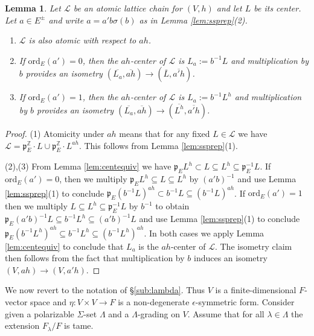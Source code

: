 \documentclass{article}
\def\mf#1{\mathfrak{#1}}
\def\mc#1{\mathcal{#1}}
\def\tx#1{\textrm{#1}}
\def\Z{\mathbb{Z}}
\def\ol#1{\overline{#1}}
\newtheorem{lem}[thm]{Lemma}
\theoremstyle{definition}
\numberwithin{equation}{subsection}
\renewcommand{\-}{\hyp{}}
\newcommand{\oL}{\overline{L}}
\begin{document}
\begin{lem} \label{lem:sign-switch}
	Let $\mc{L}$ be an atomic lattice chain for $(V,h)$ and let $L$ be its center.
	Let $a \in E^\pm$ and write $a=a'b\sigma(b)$ as in Lemma \ref{lem:ssprep}(2).
	\begin{enumerate}
				\item $\mc{L}$ is also atomic with respect to $ah$. 
		\item If $\tx{ord}_E(a')=0$, then the $ah$-center of $\mc{L}$ is $L_a := b^{-1}L$ and multiplication by $b$ provides an isometry $(\ol{L_a},\ol{ah}) \to (\oL,\ol{a'h})$.
		\item If $\tx{ord}_E(a')=1$, then the $ah$-center of $\mc{L}$ is $L_a := b^{-1}L^h$ and multiplication by $b$ provides an isometry $(\ol{L_a},\ol{ah}) \to (\ol{L^h},\ol{a'h})$.
	\end{enumerate}
\end{lem}
\begin{proof}
	(1) Atomicity under $ah$ means that for any fixed $L \in \mc{L}$ we have $\mc{L}=\mf{p}_E^\Z \cdot L \cup \mf{p}_E^\Z \cdot L^{ah}$. This follows from Lemma \ref{lem:ssprep}(1).

	(2),(3) From Lemma \ref{lem:centequiv} we have $\mf{p}_EL^h \subset L \subseteq L^h \subseteq \mf{p}_E^{-1}L$. If $\tx{ord}_E(a')=0$, then we multiply $\mf{p}_EL^h \subseteq L \subseteq L^h$ by $(a'b)^{-1}$ and use Lemma \ref{lem:ssprep}(1) to conclude $\mf{p}_E(b^{-1}L)^{ah} \subset b^{-1}L \subseteq (b^{-1}L)^{ah}$. If $\tx{ord}_E(a')=1$ then we multiply $L \subseteq L^h \subseteq \mf{p}_E^{-1}L$ by $b^{-1}$ to obtain $\mf{p}_E(a'b)^{-1}L \subseteq b^{-1}L^h \subseteq (a'b)^{-1}L$ and use Lemma \ref{lem:ssprep}(1) to conclude $\mf{p}_E(b^{-1}L^h)^{ah} \subseteq b^{-1}L^h \subseteq (b^{-1}L^h)^{ah}$. In both cases we apply Lemma \ref{lem:centequiv} to conclude that $L_a$ is the $ah$-center of $\mc{L}$. The isometry claim then follows from the fact that multiplication by $b$ induces an isometry $(V,ah) \to (V,a'h)$.
\end{proof}


We now revert to the notation of \S\ref{sub:lambda}. Thus $V$ is a finite-dimensional $F$-vector space and $\eta : V \times V \to F$ is a non-degenerate $\epsilon$-symmetric form. Consider given a polarizable $\Sigma$-set $\Lambda$ and a $\Lambda$-grading on $V$. Assume that for all $\lambda \in \Lambda$ the extension $F_\lambda/F$ is tame.
\end{document}
